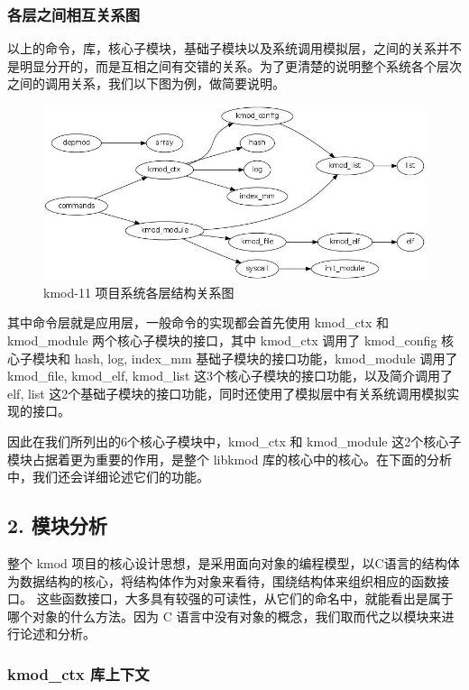 \documentclass[11pt,a4paper]{article}
\makeatletter
\def\maxwidth{\ifdim\Gin@nat@width>\linewidth\linewidth
\else\Gin@nat@width\fi}
\let\Oldincludegraphics\includegraphics
\renewcommand{\includegraphics}[1]{\Oldincludegraphics[width=\maxwidth]{#1}}
\makeatother
\begin{document}
\subsubsection{各层之间相互关系图}

以上的命令，库，核心子模块，基础子模块以及系统调用模拟层，之间的关系并不是明显分开的，而是互相之间有交错的关系。为了更清楚的说明整个系统各个层次之间的调用关系，我们以下图为例，做简要说明。

\begin{figure}[htbp]
\centering
\includegraphics{./figures/sys.jpg}
\caption{kmod-11 项目系统各层结构关系图}
\end{figure}

其中命令层就是应用层，一般命令的实现都会首先使用 kmod\_ctx 和
kmod\_module 两个核心子模块的接口，其中 kmod\_ctx 调用了 kmod\_config
核心子模块和 hash, log, index\_mm 基础子模块的接口功能，kmod\_module
调用了 kmod\_file, kmod\_elf, kmod\_list
这3个核心子模块的接口功能，以及简介调用了 elf, list
这2个基础子模块的接口功能，同时还使用了模拟层中有关系统调用模拟实现的接口。

因此在我们所列出的6个核心子模块中，kmod\_ctx 和 kmod\_module
这2个核心子模块占据着更为重要的作用，是整个 libkmod
库的核心中的核心。在下面的分析中，我们还会详细论述它们的功能。

\subsection{2. 模块分析}

整个 kmod
项目的核心设计思想，是采用面向对象的编程模型，以C语言的结构体为数据结构的核心，将结构体作为对象来看待，围绕结构体来组织相应的函数接口。
这些函数接口，大多具有较强的可读性，从它们的命名中，就能看出是属于哪个对象的什么方法。因为
C 语言中没有对象的概念，我们取而代之以模块来进行论述和分析。

\subsubsection{kmod\_ctx 库上下文}
\end{document}
